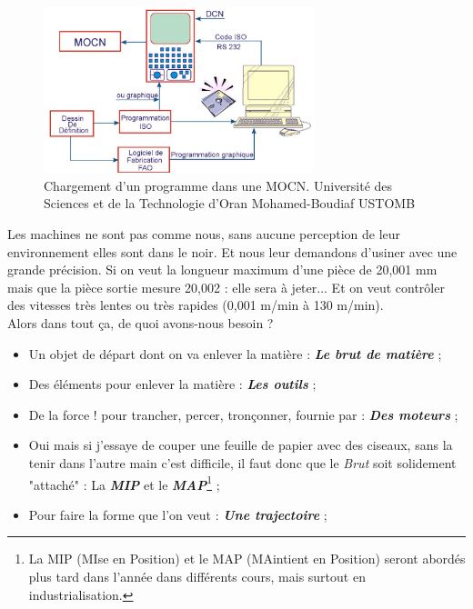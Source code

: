 \documentclass[
	11pt, %
	fleqn, %
	a4paper, %
]{LegrandOrangeBook}
\begin{document}
\begin{figure}[H] %
	\centering %
	\includegraphics[width=0.7\textwidth]{Images/iso.JPG} %
	\caption{Chargement d'un programme dans une MOCN. Université des Sciences et de la Technologie d'Oran Mohamed-Boudiaf USTOMB}
	\label{iso3} %
\end{figure}



Les machines ne sont pas comme nous, sans aucune perception de leur environnement elles sont dans le noir. Et nous leur demandons d'usiner avec une grande précision. Si on veut la longueur maximum d'une pièce de 20,001 mm mais que la pièce sortie mesure 20,002 : elle sera à jeter... Et on veut contrôler des vitesses très lentes ou très rapides (0,001 m/min à 130 m/min). \\



Alors dans tout ça, de quoi avons-nous besoin ? \\

\begin{theorem}
\begin{itemize}
    \item Un objet de départ dont on va enlever la matière : \textit{\textbf{Le brut de matière}} ;
    \item Des éléments pour enlever la matière : \textit{\textbf{Les outils}} ;
    \item De la force ! pour trancher, percer, tronçonner, fournie par : \textit{\textbf{Des moteurs}} ; 
    \item Oui mais si j'essaye de couper une feuille de papier avec des ciseaux, sans la tenir dans l'autre main c'est difficile, il faut donc que le \textit{Brut} soit solidement "attaché" : La \textit{\textbf{MIP}} et le \textit{\textbf{MAP}}\footnote{La MIP (MIse en Position) et le MAP (MAintient en Position) seront abordés plus tard dans l'année dans différents cours, mais surtout en industrialisation.}  ;
    \item  Pour faire la forme que l'on veut : \textit{\textbf{Une trajectoire}} ;
\end{itemize}
\end{theorem}
\end{document}
